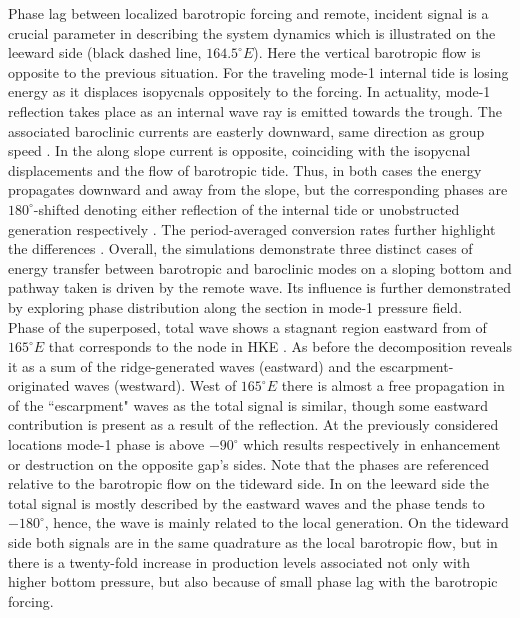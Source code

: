 \documentclass[12pt]{article}
\begin{document}
Phase lag between localized barotropic forcing and remote, incident signal is a 
crucial parameter in describing the system dynamics which is illustrated on the leeward side (black 
dashed line, $164.5^{\circ}E$). Here the vertical barotropic flow is opposite to the previous 
situation. For  the traveling mode-1 internal tide is losing energy as it displaces 
isopycnals oppositely to the forcing. In actuality, mode-1 reflection takes place as an internal 
wave ray is emitted towards the trough. The associated baroclinic currents are easterly downward, 
same direction as group speed . In  the along slope current 
is opposite, coinciding with the isopycnal displacements and the flow of barotropic tide. Thus, in 
both cases the energy propagates downward and away from the slope, but the corresponding phases are 
$180^{\circ}$-shifted denoting either reflection of the internal tide or unobstructed generation 
respectively . The period-averaged conversion rates further highlight the 
differences . Overall, the simulations demonstrate three distinct cases 
of energy transfer between barotropic and baroclinic modes on a sloping bottom and pathway taken 
is driven by the remote wave. Its influence is further demonstrated by exploring phase distribution 
along the section  in mode-1 pressure field.\\

Phase of the superposed, total wave shows a stagnant region eastward from of $165^{\circ}E$ that 
corresponds to the node in HKE . As before the decomposition reveals 
it as a sum of the ridge-generated waves (eastward) and the escarpment-originated waves (westward). 
West of $165^{\circ}E$ there is almost a free propagation in  of the ``escarpment" 
waves as the total signal is similar, though some eastward contribution is present as a result of 
the reflection. At the previously considered locations mode-1 phase is above $-90^{\circ}$ which 
results respectively in enhancement or destruction on the opposite gap's sides. Note that the 
phases are referenced relative to the barotropic flow on the tideward side. In  on the 
leeward side the total signal is mostly described by the eastward waves and the phase tends to 
$-180^{\circ}$, hence, the wave is mainly related to the local generation. On the tideward side 
both signals are in the same quadrature as the local barotropic flow, but in  there 
is a twenty-fold increase in production levels associated not only with higher bottom pressure, but 
also because of small phase lag with the barotropic forcing.
\end{document}
